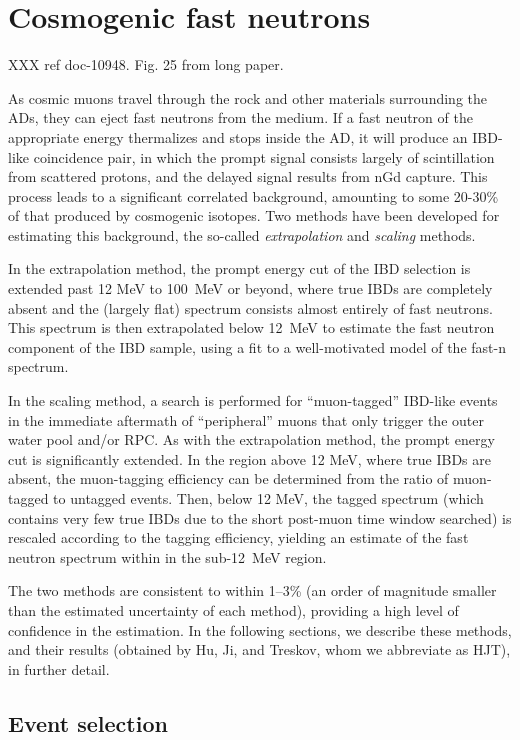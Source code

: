 \documentclass[../thesis.tex]{subfiles}
\begin{document}
\section{Cosmogenic fast neutrons}

XXX ref doc-10948. Fig. 25 from long paper.

As cosmic muons travel through the rock and other materials surrounding the ADs,
they can eject fast neutrons from the medium. If a fast neutron of the
appropriate energy thermalizes and stops inside the AD, it will produce an
IBD-like coincidence pair, in which the prompt signal consists largely of
scintillation from scattered protons, and the delayed signal results from nGd
capture. This process leads to a significant correlated background, amounting to
some 20-30\% of that produced by cosmogenic isotopes. Two methods have been
developed for estimating this background, the so-called \emph{extrapolation} and
\emph{scaling} methods.

In the extrapolation method, the prompt energy cut of the IBD selection is
extended past 12 MeV to 100~MeV or beyond, where true IBDs are completely absent
and the (largely flat) spectrum consists almost entirely of fast neutrons. This
spectrum is then extrapolated below 12~MeV to estimate the fast neutron
component of the IBD sample, using a fit to a well-motivated model of the fast-n
spectrum.

In the scaling method, a search is performed for ``muon-tagged'' IBD-like events
in the immediate aftermath of ``peripheral'' muons that only trigger the outer
water pool and/or RPC. As with the extrapolation method, the prompt energy cut
is significantly extended. In the region above 12 MeV, where true IBDs are
absent, the muon-tagging efficiency can be determined from the ratio of
muon-tagged to untagged events. Then, below 12 MeV, the tagged spectrum (which
contains very few true IBDs due to the short post-muon time window searched) is
rescaled according to the tagging efficiency, yielding an estimate of the fast
neutron spectrum within in the sub-12~MeV region.

The two methods are consistent to within 1--3\% (an order of magnitude smaller
than the estimated uncertainty of each method), providing a high level of
confidence in the estimation. In the following sections, we describe these
methods, and their results (obtained by Hu, Ji, and Treskov, whom we abbreviate
as HJT), in further detail.

\subsection{Event selection}
\label{sec:fastn_sel}
\end{document}
